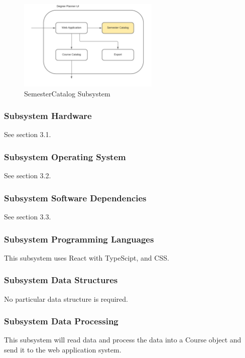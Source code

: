 \begin{figure}[h!]
	\centering
 	\includegraphics[width=0.60\textwidth]{images/SemesterCatalog} %
 \caption{SemesterCatalog Subsystem} %
\end{figure}

\subsubsection{Subsystem Hardware}
See section 3.1.

\subsubsection{Subsystem Operating System}
See section 3.2.

\subsubsection{Subsystem Software Dependencies}
See section 3.3. 

\subsubsection{Subsystem Programming Languages}
This subsystem uses React with TypeScipt, and CSS.

\subsubsection{Subsystem Data Structures}
No particular data structure is required.

\subsubsection{Subsystem Data Processing}
This subsystem will read data and process the data into a Course object and send it to the web application system.


